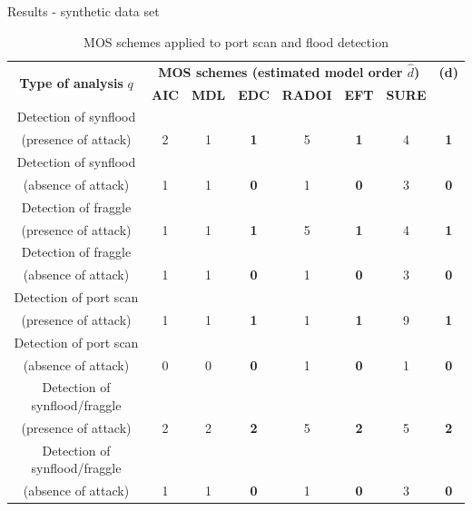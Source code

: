 \documentclass[newPxFont, numfooter, sectionpages]{beamer}
\begin{document}
\begin{frame}{Results - synthetic data set}
	\begin{table}[h!]
	  \centering
	  \tiny
	  \caption{MOS schemes applied to port scan and flood detection}
	  \label{tab:tab4}
	  \begin{tabular}{ c c c c c c c c }
		\toprule
		\multirow{2}{*}{\textbf{Type of analysis} $q$} &\multicolumn{6}{c}{\textbf{MOS schemes (estimated model order $\hat{d}$)}} &{\textbf{(d)}}\\ 
				\hhline{~------~}
			&\textbf{AIC} &\textbf{MDL} &\textbf{EDC} &\textbf{RADOI} &\textbf{EFT} &\textbf{SURE}\\
		\midrule
		Detection of synflood \\(presence of attack) &2 &1 &\textbf{\color{red}1} &5 &\textbf{\color{red}1} &4 &\textbf{\color{red}1} \\
		Detection of synflood \\(absence of attack) &1 &1 &\textbf{\color{red}0} &1 &\textbf{\color{red}0} &3 &\textbf{\color{red}0} \\
		\midrule
		Detection of fraggle \\(presence of attack) &1 &1 &\textbf{\color{red}1} &5 &\textbf{\color{red}1} &4 &\textbf{\color{red}1} \\
		Detection of fraggle \\(absence of attack) &1 &1 &\textbf{\color{red}0} &1 &\textbf{\color{red}0} &3 &\textbf{\color{red}0} \\
		\midrule
		Detection of port scan \\(presence of attack) &1 &1 &\textbf{\color{red}1} &1 &\textbf{\color{red}1} &9 &\textbf{\color{red}1} \\
		Detection of port scan \\(absence of attack) &0 &0 &\textbf{\color{red}0} &1 &\textbf{\color{red}0} &1 &\textbf{\color{red}0} \\
		\midrule
		Detection of synflood/fraggle \\(presence of attack) &2 &2 &\textbf{\color{red}2} &5 &\textbf{\color{red}2} &5 &\textbf{\color{red}2} \\
		Detection of synflood/fraggle \\(absence of attack) &1 &1 &\textbf{\color{red}0} &1 &\textbf{\color{red}0} &3 &\textbf{\color{red}0} \\
	    \bottomrule
	  \end{tabular}
	\end{table}
\end{frame}
\end{document}
